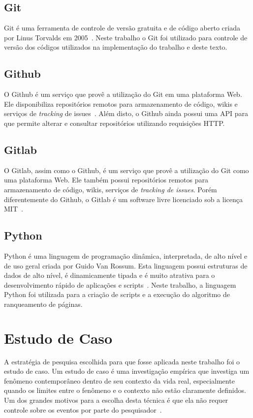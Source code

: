 \subsection{Git}
\label{met:tec:git}
Git é uma ferramenta de controle de versão gratuita e de código aberto criada
por Linus Torvalds em 2005~\cite{chacon}. Neste trabalho o Git foi utilizado 
para controle de versão dos códigos utilizados na implementação do trabalho
e deste texto.

\subsection{Github}
\label{met:tec:github}
O Github é um serviço que provê a utilização do Git em uma plataforma Web. Ele 
disponibiliza repositórios remotos para armazenamento de código, wikis e serviços
de \textit{tracking} de issues~\cite{github}. Além disto, o Github ainda possui uma API para
que permite alterar e consultar repositórios utilizando requisições HTTP.

\subsection{Gitlab}
\label{met:tec:gitlab}
O Gitlab, assim como o Github, é um serviço que provê a utilização do Git como
uma plataforma Web. Ele também possui repositórios remotos para armazenamento
de código, wikis, serviços de \textit{tracking de issues}. Porém diferentemente
do Github, o Gitlab é um software livre licenciado sob a licença MIT~\cite{gitlab}.

\subsection{Python}
\label{met:tec:python}
Python é uma linguagem de programação dinâmica, interpretada, de alto nível e de 
uso geral criada por Guido Van Rossum. Esta linguagem possui estruturas de dados
de alto nível, é dinamicamente tipada e é muito atrativa para o desenvolvimento rápido
de aplicações e scripts~\cite{python}. Neste trabalho, a linguagem Python foi utilizada para a criação
de scripts e a execução do algoritmo de ranqueamento de páginas.

\section{Estudo de Caso}
\label{met:est}
A estratégia de pesquisa escolhida para que fosse aplicada neste trabalho foi o
estudo de caso. Um estudo de caso é uma investigação empírica que investiga um 
fenômeno contemporâneo dentro de seu contexto da vida real, especialmente quando 
os limites entre o fenômeno e o contexto não estão claramente definidos. Um dos 
grandes motivos para a escolha desta técnica é que ela não requer controle sobre
os eventos por parte do pesquisador~\cite{yin}.

